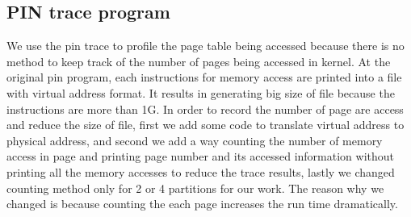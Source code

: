 \documentclass[a4paper, 11pt, conference]{ieeeconf}      %
\begin{document}
\subsection{PIN trace program}
	We use the pin trace to profile the page table being accessed because there is no method to keep track of the number of pages being accessed in kernel.  At the original pin program, each instructions for memory access are printed into a file with virtual address format. It results in generating big size of file because the instructions are more than 1G.  In order to record the number of page are access and reduce the size of file, first we add some code to translate virtual address to physical address, and second we add a way counting the number of memory access in page and printing page number and its accessed information without printing all the memory accesses to reduce the trace results, lastly we changed counting method only for 2 or 4 partitions for our work.  The reason why we changed is because counting the each page increases the run time dramatically.



\end{document}
